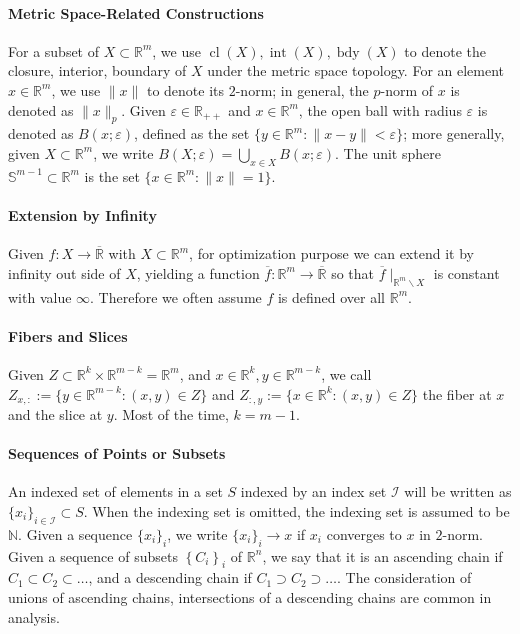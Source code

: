 \paragraph{Metric Space-Related Constructions}For a subset of $X\subset \mathbb{R}^m$, we use $\operatorname{cl}(X),\operatorname{int}(X),\operatorname{bdy}(X)$ to denote the closure, interior, boundary of $X$ under the metric space topology. For an element $x\in \mathbb{R}^m$, we use $\|x\|$ to denote its $2$-norm; in general, the $p$-norm of $x$ is denoted as $\|x\|_p$. Given $\varepsilon \in \mathbb{R}_{++}$ and $x\in \mathbb{R}^m$, the open ball with radius $\varepsilon$ is denoted as $B(x;\varepsilon )$, defined as the set $\{y\in \mathbb{R}^m:\|x-y\|<\varepsilon \}$; more generally, given $X\subset \mathbb{R}^m$, we write $B(X;\varepsilon )=\bigcup_{x\in X}B(x;\varepsilon )$. The unit sphere $\mathbb{S}^{m-1}\subset \mathbb{R}^m$ is the set $\{x\in \mathbb{R}^m:\|x\|=1\}$.

\paragraph{Extension by Infinity}Given $f:X\to\overline{\mathbb{R}}$ with $X\subset \mathbb{R}^m$, for optimization purpose we can extend it by infinity out side of $X$, yielding a function $\overline{f}:\mathbb{R}^m\to\overline{\mathbb{R}}$ so that $\overline{f}\mid_{\mathbb{R}^m\smallsetminus X}$ is constant with value $\infty$. Therefore we often assume $f$ is defined over all $\mathbb{R}^m$.

\paragraph{Fibers and Slices}Given $Z\subset \mathbb{R}^{k}\times \mathbb{R}^{m-k}=\mathbb{R}^m$, and $x\in \mathbb{R}^k,y\in \mathbb{R}^{m-k}$, we call $Z_{x,:}:=\{y\in \mathbb{R}^{m-k}:(x,y)\in Z\}$ and $Z_{:,y}:=\{x\in \mathbb{R}^{k}:(x,y)\in Z\}$ the fiber at $x$ and the slice at $y$. Most of the time, $k=m-1$.

\paragraph{Sequences of Points or Subsets}An indexed set of elements in a set $S$ indexed by an index set $\mathcal{I}$ will be written as $\{x_i\}_{i\in \mathcal{I}}\subset S$. When the indexing set is omitted, the indexing set is assumed to be $\mathbb{N}$. Given a sequence $\{x_i\}_{i}$, we write $\{x_i\}_i\to x$ if $x_i$ converges to $x$ in $2$-norm. Given a sequence of subsets $\left\{C_i\right\}_{i}$ of $\mathbb{R}^n$, we say that it is an ascending chain if $C_1\subset C_2\subset \dotsc$, and a descending chain if $C_1\supset C_2\supset \dotsc$. The consideration of unions of ascending chains, intersections of a descending chains are common in analysis.

